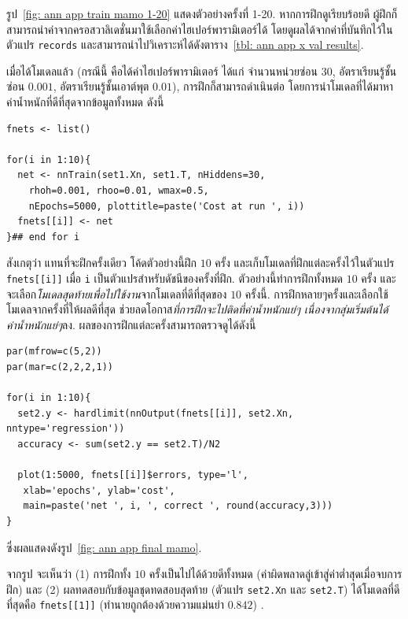 รูป~\ref{fig: ann app train mamo 1-20} แสดงตัวอย่างครั้งที่ 1-20.
หากการฝึกดูเรียบร้อยดี ผู้ฝึกก็สามารถนำค่าจากครอสวาลิเดชั่นมาใช้เลือกค่าไฮเปอร์พารามิเตอร์ได้ โดยดูผลได้จากค่าที่บันทึกไว้ในตัวแปร \texttt{records} 
และสามารถนำไปวิเคราะห์ได้ดังตาราง~\ref{tbl: ann app x val results}.

เมื่อได้โมเดลแล้ว (กรณีนี้ คือได้ค่าไฮเปอร์พารามิเตอร์ ได้แก่ จำนวนหน่วยซ่อน $30$, อัตราเรียนรู้ชั้นซ่อน $0.001$, อัตราเรียนรู้ชั้นเอาต์พุต $0.01$), การฝึกก็สามารถดำเนินต่อ โดยการนำโมเดลที่ได้มาหาค่าน้ำหนักที่ดีที่สุดจากข้อมูลทั้งหมด  ดังนี้
\begin{verbatim}
fnets <- list()

for(i in 1:10){
  net <- nnTrain(set1.Xn, set1.T, nHiddens=30, 
    rhoh=0.001, rhoo=0.01, wmax=0.5, 
    nEpochs=5000, plottitle=paste('Cost at run ', i))
  fnets[[i]] <- net
}## end for i
\end{verbatim}

สังเกตุว่า แทนที่จะฝึกครั้งเดียว โค้ดตัวอย่างนี้ฝึก $10$ ครั้ง 
และเก็บโมเดลที่ฝึกแต่ละครั้งไว้ในตัวแปร \texttt{fnets[[i]]} เมื่อ \texttt{i} เป็นตัวแปรสำหรับดัชนีของครั้งที่ฝึก.
ตัวอย่างนี้ทำการฝึกทั้งหมด $10$ ครั้ง
และจะเลือก\textit{โมเดลสุดท้ายเพื่อไปใช้งาน}จากโมเดลที่ดีที่สุดของ $10$ ครั้งนี้.
%
การฝึกหลายๆครั้งและเลือกใช้โมเดลจากครั้งที่ให้ผลดีที่สุด ช่วยลดโอกาส\textit{ที่การฝึกจะไปติดที่ค่าน้ำหนักแย่ๆ เนื่องจากสุ่มเริ่มต้นได้ค่าน้ำหนักแย่ๆ}ลง.
%
ผลของการฝึกแต่ละครั้งสามารถตรวจดูได้ดังนี้
\begin{verbatim}
par(mfrow=c(5,2))
par(mar=c(2,2,2,1))

for(i in 1:10){
  set2.y <- hardlimit(nnOutput(fnets[[i]], set2.Xn, nntype='regression'))
  accuracy <- sum(set2.y == set2.T)/N2

  plot(1:5000, fnets[[i]]$errors, type='l', 
   xlab='epochs', ylab='cost',
   main=paste('net ', i, ', correct ', round(accuracy,3)))
}
\end{verbatim}
ซึ่งผลแสดงดังรูป~\ref{fig: ann app final mamo}. 

จากรูป จะเห็นว่า (1) การฝึกทั้ง $10$ ครั้งเป็นไปได้ด้วยดีทั้งหมด (ค่าผิดพลาดลู่เข้าสู่ค่าต่ำสุดเมื่อจบการฝึก) 
และ (2) ผลทดสอบกับข้อมูลชุดทดสอบสุดท้าย (ตัวแปร \texttt{set2.Xn} และ \texttt{set2.T}) ได้โมเดลที่ดีที่สุดคือ \texttt{fnets[[1]]} (ทำนายถูกต้องด้วยความแม่นยำ $0.842$) .

